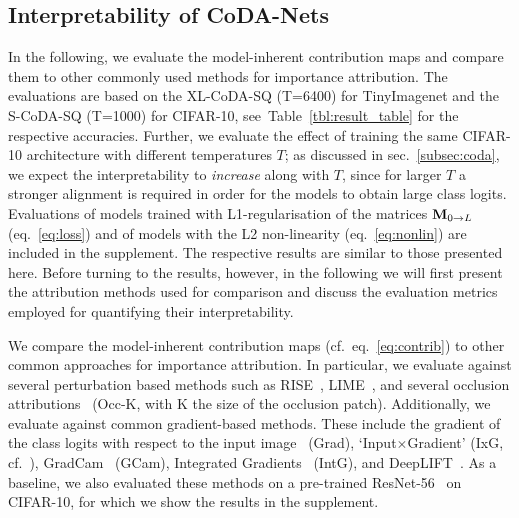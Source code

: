 \subsection{Interpretability of CoDA-Nets}
\label{subsec:intp_results}

In the following, we evaluate the model-inherent contribution maps and compare them to other commonly used me\-thods for importance attribution.
The evaluations are based on the XL-CoDA-SQ (T=6400) for TinyImagenet and the S-CoDA-SQ (T=1000) for CIFAR-10, see~Table~\ref{tbl:result_table} for the respective accuracies.
Further, we evaluate the effect of training the same CIFAR-10 architecture with different temperatures $T$; as discussed in sec.~\ref{subsec:coda}, we expect the interpretability to \emph{increase} along with $T$, since for larger $T$ a stronger alignment is required in order for the models to obtain large class logits. Evaluations of models trained with L1-regularisation of the matrices $\mat m_{0\rightarrow L}$ (eq.~\eqref{eq:loss}) and of models with the L2 non-linearity (eq.~\eqref{eq:nonlin}) are included in the supplement. The respective results are similar to those presented here. Before turning to the results, however, in the following we will first present the attribution methods used for comparison and discuss the evaluation metrics employed for quantifying their interpretability.

 We compare the model-inherent contribution maps (cf.~eq.~\eqref{eq:contrib}) to other common approaches for importance attribution. 
In particular, we evaluate against several perturbation based methods such as RISE~\cite{petsiuk2018rise}, LIME~\cite{lime}, and several occlusion attributions~\cite{zeiler2014visualizing} (Occ-K, with K the size of the occlusion patch). Additionally, we evaluate against common gradient-based methods. These include the gradient of the class logits with respect to the input image~\cite{baehrens2010explain} (Grad), `Input$\times$Gradient' (IxG, cf.~\cite{adebayo2018sanity}), GradCam~\cite{selvaraju2017grad} (GCam), Integrated Gradients~\cite{sundararajan2017axiomatic} (IntG), and DeepLIFT~\cite{shrikumar2017deeplift}. As a baseline, we also evaluated these methods on a pre-trained ResNet-56~\cite{he2016deep} on CIFAR-10, for which we show the results in the supplement.


